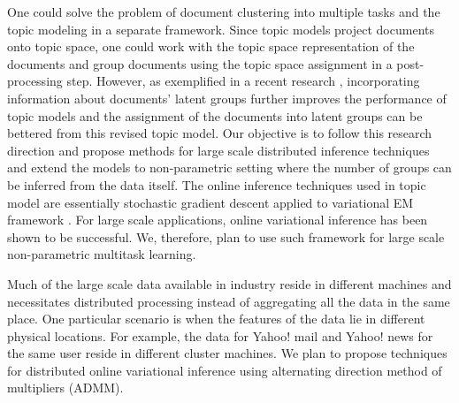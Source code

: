 \documentclass[10pts,fleqn]{article}
\begin{document}
One could solve the problem of document clustering into multiple
tasks and the topic modeling in a separate framework. Since topic models project documents
onto topic space, one could work with the topic space representation of the documents
and group documents using the topic space assignment
in a post-processing step. However, as exemplified in a recent research
\cite{xixi13}, incorporating information about documents' latent
groups further improves the performance of topic models and the assignment
of the documents into latent groups can be bettered from this
revised topic model.
Our objective is to follow this research direction and propose methods for
large scale distributed inference techniques and extend the models to non-parametric
setting where the number of groups can be inferred from the data itself.
The online inference techniques used in topic model are essentially
stochastic gradient descent applied to variational EM framework
\cite{hobb10,wapb11}. For large scale applications, online variational
inference has been shown to be successful. We, therefore, plan to use such
framework for large scale non-parametric multitask learning.

Much of the large scale data available in industry reside in different
machines and necessitates distributed processing instead
of aggregating all the data in the same place. One particular scenario
is when the features of the data lie in different physical locations. For example, the data for
Yahoo! mail and Yahoo! news for the same user reside in different
cluster machines. We plan to propose techniques for distributed online variational inference
using alternating direction method of multipliers (ADMM)\cite{bopc11}.


\end{document}

